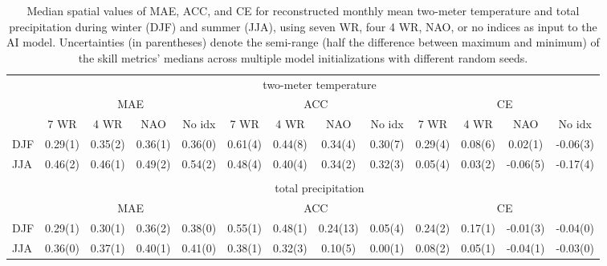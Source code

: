 \begin{table*}
    \centering
    \begin{tabular}{lcccccccccccc}
    \toprule
    &\multicolumn{12}{c}{two-meter temperature}\\
    &\multicolumn{4}{c}{MAE}    &\multicolumn{4}{c}{ACC}    &\multicolumn{4}{c}{CE}\\
    \cmidrule(lr){2-5} \cmidrule(lr){6-9} \cmidrule(lr){10-13}
              &7 WR  &4 WR  &NAO  &No idx  &7 WR  &4 WR  &NAO  &No idx  &7 WR  &4 WR  &NAO  &No idx\\
    DJF    &0.29(1)  &0.35(2)  &0.36(1)  &0.36(0)  &0.61(4)  &0.44(8)  &0.34(4)  &0.30(7)  &0.29(4)  &0.08(6)  &0.02(1)  &-0.06(3) \\
    JJA    &0.46(2)  &0.46(1)  &0.49(2)  &0.54(2)  &0.48(4)  &0.40(4)  &0.34(2)  &0.32(3)  &0.05(4)  &0.03(2)  &-0.06(5)  &-0.17(4) \\
    \cmidrule(lr){2-13} \\
    &\multicolumn{12}{c}{total precipitation}\\
    &\multicolumn{4}{c}{MAE}    &\multicolumn{4}{c}{ACC}    &\multicolumn{4}{c}{CE}\\
    \cmidrule(lr){2-5} \cmidrule(lr){6-9} \cmidrule(lr){10-13}
    DJF    &0.29(1)  &0.30(1)  &0.36(2)  &0.38(0)  &0.55(1)  &0.48(1)  &0.24(13)  &0.05(4)  &0.24(2)  &0.17(1)  &-0.01(3)  &-0.04(0) \\
    JJA    &0.36(0)  &0.37(1)  &0.40(1)  &0.41(0)  &0.38(1)  &0.32(3)  &0.10(5)  &0.00(1)  &0.08(2)  &0.05(1)  &-0.04(1)  &-0.03(0) \\
    \bottomrule
    \end{tabular}
    \caption{Median spatial values of MAE, ACC, and CE for reconstructed monthly mean two-meter temperature and total precipitation during winter (DJF) and summer (JJA), using seven \ac{WR}, four 4 \ac{WR}, NAO, or no indices as input to the AI model. Uncertainties (in parentheses) denote the semi-range (half the difference between maximum and minimum) of the skill metrics’ medians across multiple model initializations with different random seeds.}
    \label{tab:numWR}
\end{table*}